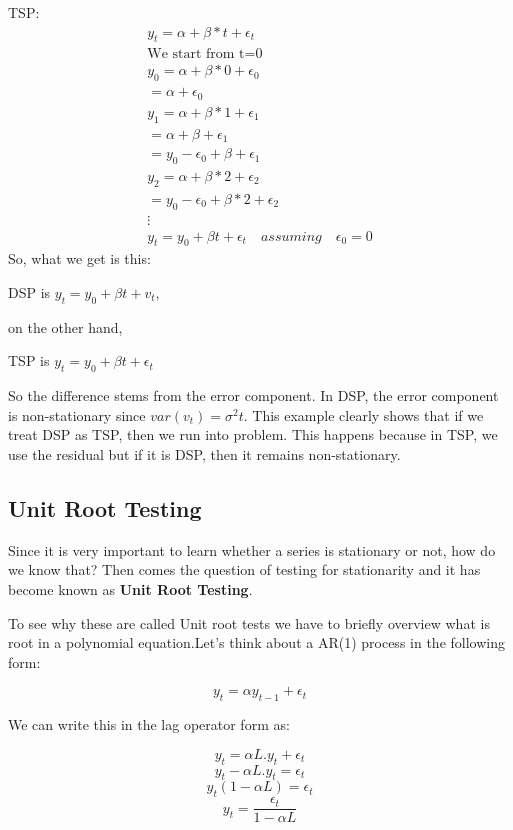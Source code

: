 \documentclass{book}
\begin{document}
TSP:
\begin{align*}
y_t=\alpha+\beta*t+\epsilon_t \\
\mbox{We start from t=0} \\
y_0=\alpha+\beta*0+\epsilon_0 \\
 =\alpha+\epsilon_0 \\
y_1=\alpha+\beta*1+\epsilon_1 \\
 =\alpha+\beta+\epsilon_1  \\
= y_0 -\epsilon_0+\beta+\epsilon_1 \\
y_2=\alpha+\beta*2+\epsilon_2  \\
=y_0-\epsilon_0+\beta*2+\epsilon_2 \\
\vdots \\
y_t=y_0+\beta t+\epsilon_t \quad assuming \quad \epsilon_0=0
\end{align*}
So, what we get is this: \\
\begin{center} DSP is $y_t=y_0+ \beta t+v_t $,\end{center} on the other hand, \\
\begin{center}TSP is $y_t=y_0+\beta t+\epsilon_t$ \end{center}

So the difference stems from the error component. In DSP, the error component is non-stationary since $var(v_t)=\sigma^2t$. This example clearly shows that if we treat DSP as TSP, then we run into problem. This happens because in TSP, we use the residual but if it is DSP, then it remains non-stationary. 

\subsection{Unit Root Testing}
Since it is very important to learn whether a series is stationary or not, how do we know that? Then comes the question of testing for stationarity and it has become known as \textbf{Unit Root Testing}.

To see why these are called Unit root tests we have to briefly overview what is root in a polynomial equation.Let's think about a AR(1) process in the following form:

          $$ y_t=\alpha y_{t-1}+\epsilon_t $$

We can write this in the lag operator form as:

          $$y_t=\alpha L.y_t+\epsilon_t$$
          $$y_t-\alpha L.y_t=\epsilon_t$$
          $$y_t(1-\alpha L)=\epsilon_t$$
          $$y_t=\frac{\epsilon_t}{1-\alpha L}$$
\end{document}
